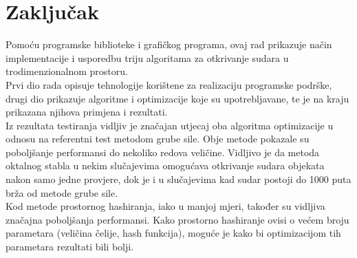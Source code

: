 \chapter{Zaključak}

Pomoću programske biblioteke i grafičkog programa, ovaj rad prikazuje
način implementacije i usporedbu triju algoritama za otkrivanje sudara
u trodimenzionalnom prostoru.
\\
Prvi dio rada opisuje tehnologije korištene
za realizaciju programske podrške, drugi dio prikazuje algoritme i optimizacije
koje su upotrebljavane, te je na kraju prikazana njihova primjena i rezultati.
\\
Iz rezultata testiranja vidljiv je značajan utjecaj oba algoritma optimizacije
u odnosu na referentni test metodom grube sile. Obje metode pokazale su poboljšanje
performansi do nekoliko redova veličine. Vidljivo je da metoda oktalnog stabla
u nekim slučajevima omogućava otkrivanje sudara objekata nakon samo jedne provjere,
dok je i u slučajevima kad sudar postoji do 1000 puta brža od metode grube sile.
\\
Kod metode prostornog hashiranja, iako u manjoj mjeri, također su vidljiva
značajna poboljšanja performansi. Kako prostorno hashiranje ovisi o većem broju
parametara (veličina čelije, hash funkcija), moguće je kako bi optimizacijom
tih parametara rezultati bili bolji.
